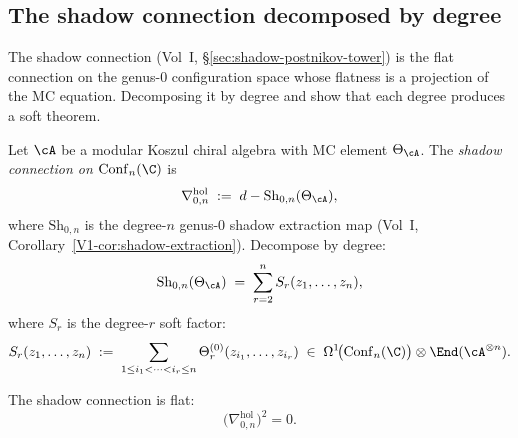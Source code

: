 \subsection{The shadow connection decomposed by degree}

The shadow connection (Vol~I, \S\ref*{sec:shadow-postnikov-tower}) is the flat connection
on the genus-$0$ configuration space whose flatness is a projection of the MC equation.
Decomposing it by degree and show that each degree produces a soft theorem.

\begin{definition}
Let $\cA$ be a modular Koszul chiral algebra with MC element $\Theta_\cA$. The
\emph{shadow connection on $\mathrm{Conf}_n(\C)$} is
\begin{equation}
\nabla^{\mathrm{hol}}_{0,n}
\;:=\;
d - \mathrm{Sh}_{0,n}(\Theta_\cA),
\end{equation}
where $\mathrm{Sh}_{0,n}$ is the degree-$n$ genus-$0$ shadow extraction map
(Vol~I, Corollary~\ref*{V1-cor:shadow-extraction}). Decompose by degree:
\begin{equation}
\mathrm{Sh}_{0,n}(\Theta_\cA)
\;=\;
\sum_{r=2}^{n} S_r(z_1, \ldots, z_n),
\end{equation}
where $S_r$ is the degree-$r$ soft factor:
\begin{equation}
S_r(z_1, \ldots, z_n)
\;:=\;
\sum_{1 \leq i_1 < \cdots < i_r \leq n}
\Theta^{(0)}_{r}(z_{i_1}, \ldots, z_{i_r})
\;\in\;
\Omega^1\!\bigl(\mathrm{Conf}_n(\C)\bigr)
\otimes \End(\cA^{\otimes n}).
\end{equation}
\end{definition}

\begin{theorem}
The shadow connection is flat:
\begin{equation}
\label{eq:flatness-equation}
\bigl(\nabla^{\mathrm{hol}}_{0,n}\bigr)^2 = 0.
\end{equation}
\end{theorem}

